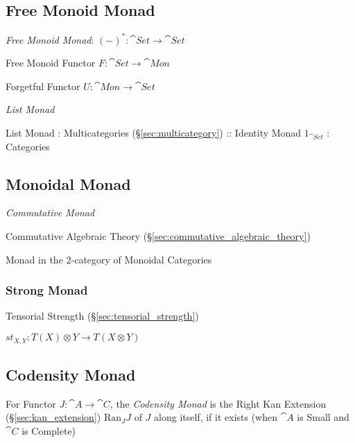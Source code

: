 \subsection{Free Monoid Monad}\label{sec:free_monoid_monad}

\emph{Free Monoid Monad}: $(-)^* : \cat{Set} \rightarrow \cat{Set}$

Free Monoid Functor $F : \cat{Set} \rightarrow \cat{Mon}$

Forgetful Functor $U : \cat{Mon} \rightarrow \cat{Set}$

\emph{List Monad}

List Monad : Multicategories (\S\ref{sec:multicategory}) :: Identity
Monad $1_{\cat{Set}}$ : Categories



\subsection{Monoidal Monad}\label{sec:monoidal_monad}

\emph{Commutative Monad}

Commutative Algebraic Theory
(\S\ref{sec:commutative_algebraic_theory})

Monad in the $2$-category of Monoidal Categories




\subsubsection{Strong Monad}\label{sec:strong_monad}

Tensorial Strength (\S\ref{sec:tensorial_strength})

$st_{X,Y} : T(X) \otimes Y \rightarrow T(X \otimes Y)$



\subsection{Codensity Monad}\label{sec:codensity_monad}

For Functor $J : \cat{A} \rightarrow \cat{C}$, the \emph{Codensity
  Monad} is the Right Kan Extension (\S\ref{sec:kan_extension})
$\mathrm{Ran}_J J$ of $J$ along itself, if it exists (when $\cat{A}$
is Small and $\cat{C}$ is Complete)

